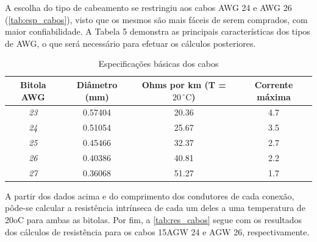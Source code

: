 A escolha do tipo de cabeamento se restringiu aos cabos AWG 24 e AWG 26 (\autoref{tab:esp_cabos}), visto que os mesmos são mais fáceis de serem comprados, com maior confiabilidade. A
Tabela 5 demonstra as principais características dos tipos de AWG, o que será necessário para
efetuar os cálculos posteriores.

\begin{table}[H]
\centering
\caption{Especificações básicas dos cabos}
\label{tab:esp_cabos}
\begin{tabular}{|c|c|c|c|}
\hline
\textbf{Bitola AWG} & \textbf{Diâmetro (mm)} & \textbf{Ohms por km (T = $20\,^{\circ}\mathrm{C}$)} & \textbf{Corrente máxima} \\ \hline
\textit{23}         & 0.57404                & 20.36                           & 4.7                      \\ \hline
\textit{24}         & 0.51054                & 25.67                           & 3.5                      \\ \hline
\textit{25}         & 0.45466                & 32.37                           & 2.7                      \\ \hline
\textit{26}         & 0.40386                & 40.81                           & 2.2                      \\ \hline
\textit{27}         & 0.36068                & 51.27                           & 1.7                      \\ \hline
\end{tabular}
\end{table}

A partir dos dados acima e do comprimento dos condutores de cada conexão, pôde-se
calcular a resistência intrínseca de cada um deles a uma temperatura de 20oC para ambas as
bitolas. Por fim, a \autoref{tab:res_cabos} segue com os resultados dos cálculos de resistência para os cabos 15AGW 24 e AGW 26, respectivamente.

